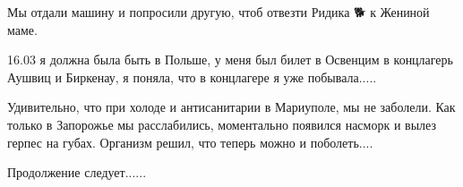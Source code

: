 Мы отдали машину и попросили другую, чтоб отвезти Ридика 🐕 к Жениной маме. 

16.03 я должна была быть в Польше, у меня был билет в Освенцим в концлагерь
Аушвиц и Биркенау, я поняла, что в концлагере я уже побывала..... 

Удивительно, что при холоде и антисанитарии в Мариуполе, мы не заболели. Как
только в Запорожье мы расслабились, моментально появился насморк и вылез герпес
на губах. Организм решил, что теперь можно и поболеть....

Продолжение следует......

